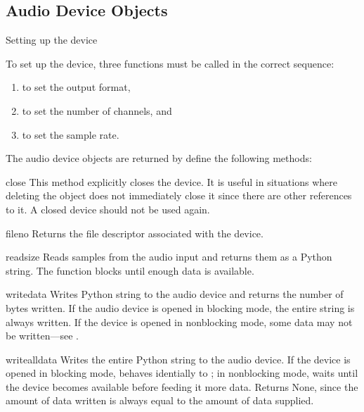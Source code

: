 \subsection{Audio Device Objects \label{ossaudio-device-objects}}

Setting up the device

To set up the device, three functions must be called in the correct
sequence:
\begin{enumerate}
\item {} to set the output format,
\item {} to set the number of channels, and
\item {} to set the sample rate.
\end{enumerate}

The audio device objects are returned by  define the
following methods:

\begin{methoddesc}{close}{}
This method explicitly closes the device.  It is useful in situations
where deleting the object does not immediately close it since there are
other references to it.  A closed device should not be used again.
\end{methoddesc}

\begin{methoddesc}{fileno}{}
Returns the file descriptor associated with the device.
\end{methoddesc}

\begin{methoddesc}{read}{size}
Reads  samples from the audio input and returns them as a
Python string.  The function blocks until enough data is available.
\end{methoddesc}

\begin{methoddesc}{write}{data}
Writes Python string  to the audio device and returns the
number of bytes written.  If the audio device is opened in blocking
mode, the entire string is always written.  If the device is opened in
nonblocking mode, some data may not be written---see .
\end{methoddesc}

\begin{methoddesc}{writeall}{data}
Writes the entire Python string  to the audio device.  If the
device is opened in blocking mode, behaves identially to ;
in nonblocking mode, waits until the device becomes available before
feeding it more data.  Returns None, since the amount of data written is
always equal to the amount of data supplied.
\end{methoddesc}

